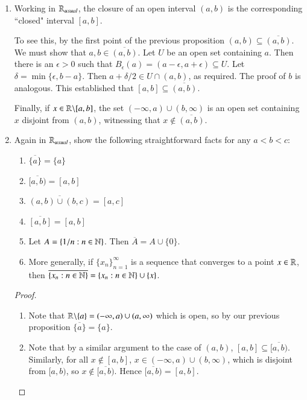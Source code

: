 \documentclass[12pt, a4paper, oneside, openright, titlepage]{book}
\begin{document}
\begin{example}
    \leavevmode
    \begin{enumerate}
        \item Working in $\mathbb R_{usual}$, the closure of an open interval $(a,b)$ is the corresponding ``closed" interval $[a,b]$.

            To see this, by the first point of the previous proposition $(a,b) \subseteq \overline{(a,b)}$. We must show that $a,b \in \overline{(a,b)}$. Let $U$ be an open set containing $a$. Then there is an $\epsilon > 0$ such that $B_{\epsilon}(a) = (a-\epsilon,a+\epsilon) \subseteq U$. Let $\delta = \min\{\epsilon,b-a\}$. Then $a+\delta/2 \in U\cap (a,b)$, as required. The proof of $b$ is analogous. This established that $[a,b] \subseteq \overline{(a,b)}$.

            Finally, if $x \in \mathbb R\backslash[a,b]$, the set $(-\infty,a)\cup(b,\infty)$ is an open set containing $x$ disjoint from $(a,b)$, witnessing that $x \notin \overline{(a,b)}$.
        \item Again in $\mathbb R_{usual}$, show the following straightforward facts for any $a<b<c$:\begin{enumerate}
                \item $\overline{\{a\}} = \{a\}$
                \item $\overline{[a,b)} = [a,b]$
                \item $\overline{(a,b)\cup(b,c)} = [a,c]$
                \item $\overline{[a,b]} = [a,b]$
                \item Let $A = \{1/n:n \in \mathbb N\}$. Then $\overline{A} = A\cup\{0\}$.
                \item More generally, if $\{x_n\}_{n=1}^{\infty}$ is a sequence that converges to a point $x \in \mathbb R$, then $\overline{\{x_n:n \in \mathbb N\}} = \{x_n:n\in\mathbb N\}\cup\{x\}$.
        \end{enumerate}
            \begin{proof}
                \leavevmode
                \begin{enumerate}
                    \item Note that $\mathbb R\backslash \{a\} = (-\infty,a)\cup(a,\infty)$ which is open, so by our previous proposition $\overline{\{a\}} = \{a\}$.
                    \item Note that by a similar argument to the case of $(a,b)$, $[a,b] \subseteq \overline{[a,b)}$. Similarly, for all $x \notin [a,b]$, $x \in (-\infty,a)\cup(b,\infty)$, which is disjoint from $[a,b)$, so $x \notin \overline{[a,b)}$. Hence $\overline{[a,b)} = [a,b]$.

\end{enumerate}
\end{proof}
\end{enumerate}
\end{example}
\end{document}
